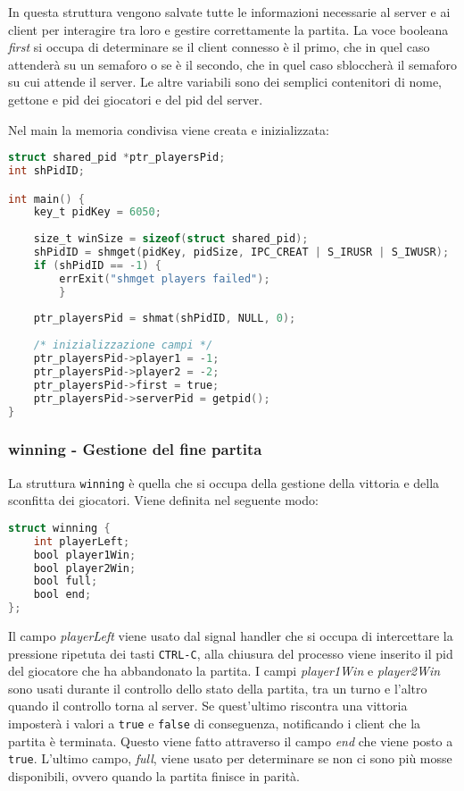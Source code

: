 \documentclass[a4paper,11pt]{article}
\begin{document}
In questa struttura vengono salvate tutte le informazioni necessarie al server e ai client per interagire tra loro e gestire correttamente la partita. La voce booleana \emph{first} si occupa di determinare se il client connesso \`e il primo, che in quel caso attender\`a su un semaforo o se \`e il secondo, che in quel caso sbloccher\`a il semaforo su cui attende il server.
Le altre variabili sono dei semplici contenitori di nome, gettone e pid dei giocatori e del pid del server.

Nel main la memoria condivisa viene creata e inizializzata:
\begin{lstlisting}[language=C]
struct shared_pid *ptr_playersPid;
int shPidID;

int main() {
	key_t pidKey = 6050;
	
	size_t winSize = sizeof(struct shared_pid);
	shPidID = shmget(pidKey, pidSize, IPC_CREAT | S_IRUSR | S_IWUSR);
	if (shPidID == -1) {
		errExit("shmget players failed");
    	}
	
	ptr_playersPid = shmat(shPidID, NULL, 0);
	
	/* inizializzazione campi */
	ptr_playersPid->player1 = -1;
	ptr_playersPid->player2 = -2;
	ptr_playersPid->first = true;
	ptr_playersPid->serverPid = getpid();
}
\end{lstlisting}

\subsubsection*{winning - Gestione del fine partita}
La struttura \texttt{winning} \`e quella che si occupa della gestione della vittoria e della sconfitta dei giocatori. Viene definita nel seguente modo:
\begin{lstlisting}[language=C]
struct winning {
	int playerLeft; 	
	bool player1Win; 
	bool player2Win;
	bool full;
	bool end;
};
\end{lstlisting}

Il campo \emph{playerLeft} viene usato dal signal handler che si occupa di intercettare la pressione ripetuta dei tasti \texttt{CTRL-C}, alla chiusura del processo viene inserito il pid del giocatore che ha abbandonato la partita.
I campi \emph{player1Win} e \emph{player2Win} sono usati durante il controllo dello stato della partita, tra un turno e l'altro quando il controllo torna al server. Se quest'ultimo riscontra una vittoria imposter\`a i valori a \texttt{true} e \texttt{false} di conseguenza, notificando i client che la partita \`e terminata. Questo viene fatto attraverso il campo \emph{end} che viene posto a \texttt{true}. L'ultimo campo, \emph{full}, viene usato per determinare se non ci sono pi\`u mosse disponibili, ovvero quando la partita finisce in parit\`a.
\end{document}

